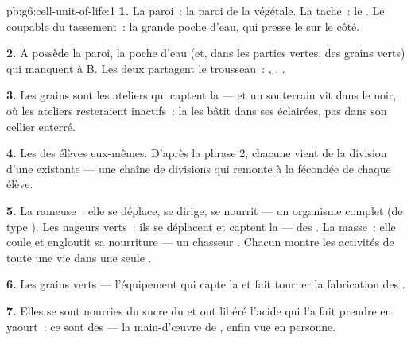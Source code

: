 \begin{solution}{pb:g6:cell-unit-of-life:1}
\textbf{1.} La paroi~: la paroi de la  végétale. La tache~:
le . Le coupable du tassement~: la grande poche d'eau, qui
presse le  sur le côté.

\textbf{2.} A possède la paroi, la poche d'eau (et, dans les parties
vertes, des grains verts) qui manquent à B. Les deux partagent le
trousseau~: , , .

\textbf{3.} Les grains sont les ateliers qui captent la  ---
et un  souterrain vit dans le noir, où les ateliers resteraient
inactifs~: la  les bâtit dans ses  éclairées, pas dans
son cellier enterré.

\textbf{4.} Les  des élèves eux-mêmes. D'après la phrase 2,
chacune vient de la division d'une  existante --- une chaîne
de divisions qui remonte à la  fécondée de chaque élève.

\textbf{5.} La rameuse~: elle se déplace, se dirige, se nourrit ---
un organisme  complet (de type ). Les nageurs
verts~: ils se déplacent et captent la  --- des 
. La masse~: elle coule et engloutit sa nourriture ---
un chasseur . Chacun montre les activités de toute une
vie dans une seule .

\textbf{6.} Les grains verts --- l'équipement qui capte la 
et fait tourner la fabrication des .

\textbf{7.} Elles se sont nourries du sucre du  et ont libéré
l'acide qui l'a fait prendre en yaourt~: ce sont des 
 --- la main-d'œuvre de , enfin vue en
personne.


\end{solution}
